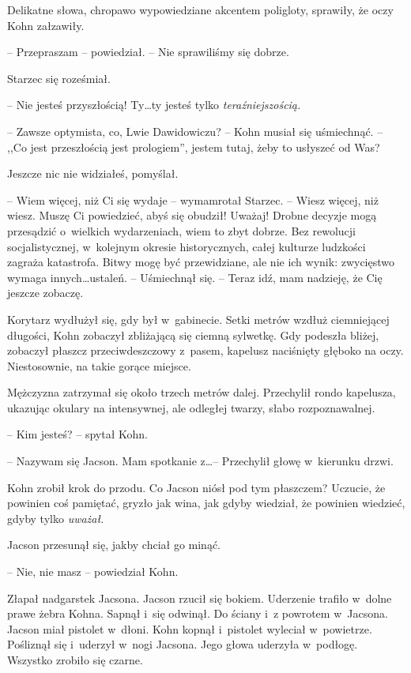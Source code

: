 \documentclass[oneside,polish,11pt,sfheadings]{mwbk}
\begin{document}
Delikatne słowa, chropawo wypowiedziane akcentem poligloty, sprawiły, że
oczy Kohn załzawiły.

-- Przepraszam -- powiedział. -- Nie sprawiliśmy się dobrze.

Starzec się roześmiał. 

-- Nie jesteś przyszłością! Ty\ldots ty jesteś tylko
\emph{teraźniejszością.}

-- Zawsze optymista, co, Lwie Dawidowiczu? -- Kohn musiał się uśmiechnąć.
-- ,,Co jest przeszłością jest prologiem'', jestem tutaj, żeby to usłyszeć
od Was?

Jeszcze nic nie widziałeś, pomyślał.

-- Wiem więcej, niż Ci się wydaje -- wymamrotał Starzec. -- Wiesz więcej,
niż wiesz. Muszę Ci powiedzieć, abyś się obudził! Uważaj! Drobne decyzje
mogą przesądzić o~wielkich wydarzeniach, wiem to zbyt dobrze. Bez
rewolucji socjalistycznej, w~kolejnym okresie historycznych, całej
kulturze ludzkości zagraża katastrofa. Bitwy mogę być przewidziane, ale
nie ich wynik: zwycięstwo wymaga innych\ldots ustaleń. -- Uśmiechnął się. -- Teraz idź, mam nadzieję, że Cię jeszcze zobaczę.

Korytarz wydłużył się, gdy był w~gabinecie. Setki metrów wzdłuż
ciemniejącej długości, Kohn zobaczył zbliżającą się ciemną sylwetkę. Gdy
podeszła bliżej, zobaczył płaszcz przeciwdeszczowy z~pasem, kapelusz
naciśnięty głęboko na oczy. Niestosownie, na takie gorące miejsce.

Mężczyzna zatrzymał się około trzech metrów dalej. Przechylił rondo
kapelusza, ukazując okulary na intensywnej, ale odległej twarzy, słabo
rozpoznawalnej.

-- Kim jesteś? -- spytał Kohn.

-- Nazywam się Jacson. Mam spotkanie z\ldots -- Przechylił głowę w~kierunku
drzwi.

Kohn zrobił krok do przodu. Co Jacson niósł pod tym płaszczem? Uczucie,
że powinien coś pamiętać, gryzło jak wina, jak gdyby wiedział, że
powinien wiedzieć, gdyby tylko \emph{uważał.}

Jacson przesunął się, jakby chciał go minąć.

-- Nie, nie masz -- powiedział Kohn.

Złapał nadgarstek Jacsona. Jacson rzucił się bokiem. Uderzenie trafiło w~dolne prawe żebra Kohna. Sapnął i~się odwinął. Do ściany i~z powrotem w~Jacsona. Jacson miał pistolet w~dłoni. Kohn kopnął i~pistolet wyleciał w~powietrze. Pośliznął się i~uderzył w~nogi Jacsona. Jego głowa uderzyła w~podłogę. Wszystko zrobiło się czarne.
\end{document}
